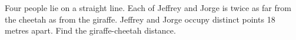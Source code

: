 Four people lie on a straight line. Each of Jeffrey and Jorge is twice as far from the cheetah as from the giraffe. Jeffrey and Jorge occupy distinct points 18 metres apart. Find the giraffe-cheetah distance.
